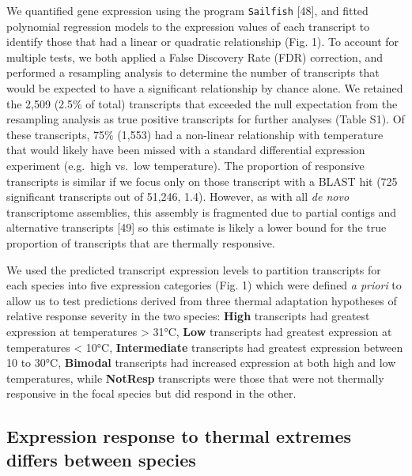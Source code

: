 \documentclass[]{article}
\begin{document}
We quantified gene expression using the program \texttt{Sailfish}
{[}48{]}, and fitted polynomial regression models to the expression
values of each transcript to identify those that had a linear or
quadratic relationship (Fig. 1). To account for multiple tests, we both
applied a False Discovery Rate (FDR) correction, and performed a
resampling analysis to determine the number of transcripts that would be
expected to have a significant relationship by chance alone. We retained
the 2,509 (2.5\% of total) transcripts that exceeded the null
expectation from the resampling analysis as true positive transcripts
for further analyses (Table S1). Of these transcripts, 75\% (1,553) had
a non-linear relationship with temperature that would likely have been
missed with a standard differential expression experiment (e.g.~high
vs.~low temperature). The proportion of responsive transcripts is
similar if we focus only on those transcript with a BLAST hit (725
significant transcripts out of 51,246, 1.4). However, as with all
\emph{de novo} transcriptome assemblies, this assembly is fragmented due
to partial contigs and alternative transcripts {[}49{]} so this estimate
is likely a lower bound for the true proportion of transcripts that are
thermally responsive.

We used the predicted transcript expression levels to partition
transcripts for each species into five expression categories (Fig. 1)
which were defined \emph{a priori} to allow us to test predictions
derived from three thermal adaptation hypotheses of relative response
severity in the two species: \textbf{High} transcripts had greatest
expression at temperatures \textgreater{} 31°C, \textbf{Low} transcripts
had greatest expression at temperatures \textless{} 10°C,
\textbf{Intermediate} transcripts had greatest expression between 10 to
30°C, \textbf{Bimodal} transcripts had increased expression at both high
and low temperatures, while \textbf{NotResp} transcripts were those that
were not thermally responsive in the focal species but did respond in
the other.

\subsection{Expression response to thermal extremes differs between
species}\label{expression-response-to-thermal-extremes-differs-between-species}
\end{document}
